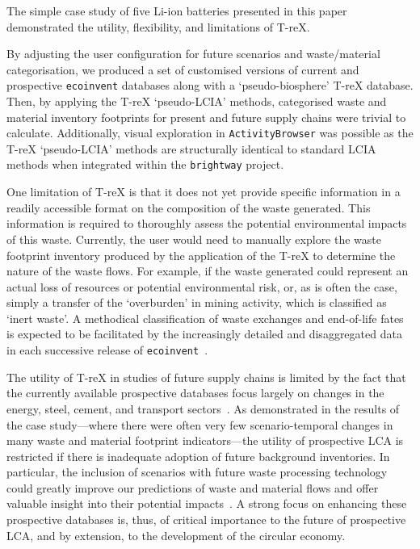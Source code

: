 \documentclass[a4paper,fleqn]{cas-dc}
\renewcommand{\texttt}[1]{{\ttfamily\small\nolinkurl{#1}}}
\begin{document}
The simple case study of five Li-ion batteries presented in this paper
demonstrated the utility, flexibility, and limitations of T-reX.

By adjusting the user configuration for future scenarios and waste/material
categorisation, we produced a set of customised versions of current and
prospective \texttt{ecoinvent} databases along with a `pseudo-biosphere' T-reX
database. Then, by applying the T-reX `pseudo-LCIA' methods, categorised waste
and material inventory footprints for present and future supply chains were
trivial to calculate. Additionally, visual exploration in
\texttt{ActivityBrowser} was possible as the T-reX `pseudo-LCIA' methods are
structurally identical to standard LCIA methods when integrated within the
\texttt{brightway} project.

One limitation of T-reX is that it does not yet provide specific information in
a readily accessible format on the composition of the waste generated. This
information is required to thoroughly assess the potential environmental
impacts of this waste. Currently, the user would need to manually explore the
waste footprint inventory produced by the application of the T-reX to determine
the nature of the waste flows. For example, if the waste generated could
represent an actual loss of resources or potential environmental risk, or, as
is often the case, simply a transfer of the `overburden' in mining activity,
which is classified as `inert waste'. A methodical classification of waste
exchanges and end-of-life fates is expected to be facilitated by the
increasingly detailed and disaggregated data in each successive release of
\texttt{ecoinvent}~\citep{fitzgerald2023ecoinventdocumentation}.

The utility of T-reX in studies of future supply chains is limited by the fact
that the currently available prospective databases focus largely on changes in
the energy, steel, cement, and transport sectors~\citep{sacchi2023premisedocs}.
As demonstrated in the results of the case study---where there were often very
few scenario-temporal changes in many waste and material footprint
indicators---the utility of prospective LCA is restricted if there is
inadequate adoption of future background inventories. In particular, the
inclusion of scenarios with future waste processing technology could greatly
improve our predictions of waste and material flows and offer valuable insight
into their potential impacts~\citep{bisinella2024wastelca}. A strong focus on
enhancing these prospective databases is, thus, of critical importance to the
future of prospective LCA, and by extension, to the development of the circular
economy.
\end{document}
